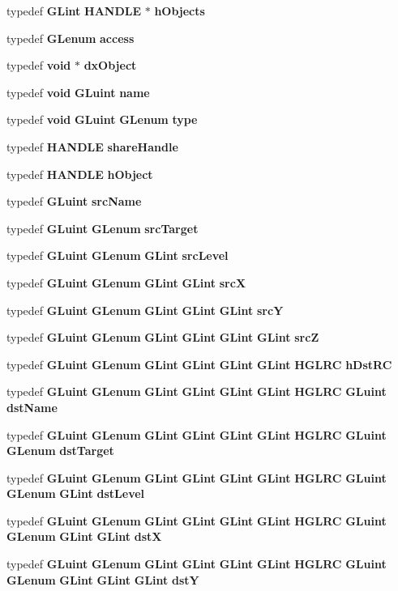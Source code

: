 \begin{DoxyCompactItemize}
\item 
typedef {\bf G\+Lint} {\bf H\+A\+N\+D\+LE} $\ast$ {\bf h\+Objects}
\item 
typedef {\bf G\+Lenum} {\bf access}
\item 
typedef {\bf void} $\ast$ {\bf dx\+Object}
\item 
typedef {\bf void} {\bf G\+Luint} {\bf name}
\item 
typedef {\bf void} {\bf G\+Luint} {\bf G\+Lenum} {\bf type}
\item 
typedef {\bf H\+A\+N\+D\+LE} {\bf share\+Handle}
\item 
typedef {\bf H\+A\+N\+D\+LE} {\bf h\+Object}
\item 
typedef {\bf G\+Luint} {\bf src\+Name}
\item 
typedef {\bf G\+Luint} {\bf G\+Lenum} {\bf src\+Target}
\item 
typedef {\bf G\+Luint} {\bf G\+Lenum} {\bf G\+Lint} {\bf src\+Level}
\item 
typedef {\bf G\+Luint} {\bf G\+Lenum} {\bf G\+Lint} {\bf G\+Lint} {\bf srcX}
\item 
typedef {\bf G\+Luint} {\bf G\+Lenum} {\bf G\+Lint} {\bf G\+Lint} {\bf G\+Lint} {\bf srcY}
\item 
typedef {\bf G\+Luint} {\bf G\+Lenum} {\bf G\+Lint} {\bf G\+Lint} {\bf G\+Lint} {\bf G\+Lint} {\bf srcZ}
\item 
typedef {\bf G\+Luint} {\bf G\+Lenum} {\bf G\+Lint} {\bf G\+Lint} {\bf G\+Lint} {\bf G\+Lint} {\bf H\+G\+L\+RC} {\bf h\+Dst\+RC}
\item 
typedef {\bf G\+Luint} {\bf G\+Lenum} {\bf G\+Lint} {\bf G\+Lint} {\bf G\+Lint} {\bf G\+Lint} {\bf H\+G\+L\+RC} {\bf G\+Luint} {\bf dst\+Name}
\item 
typedef {\bf G\+Luint} {\bf G\+Lenum} {\bf G\+Lint} {\bf G\+Lint} {\bf G\+Lint} {\bf G\+Lint} {\bf H\+G\+L\+RC} {\bf G\+Luint} {\bf G\+Lenum} {\bf dst\+Target}
\item 
typedef {\bf G\+Luint} {\bf G\+Lenum} {\bf G\+Lint} {\bf G\+Lint} {\bf G\+Lint} {\bf G\+Lint} {\bf H\+G\+L\+RC} {\bf G\+Luint} {\bf G\+Lenum} {\bf G\+Lint} {\bf dst\+Level}
\item 
typedef {\bf G\+Luint} {\bf G\+Lenum} {\bf G\+Lint} {\bf G\+Lint} {\bf G\+Lint} {\bf G\+Lint} {\bf H\+G\+L\+RC} {\bf G\+Luint} {\bf G\+Lenum} {\bf G\+Lint} {\bf G\+Lint} {\bf dstX}
\item 
typedef {\bf G\+Luint} {\bf G\+Lenum} {\bf G\+Lint} {\bf G\+Lint} {\bf G\+Lint} {\bf G\+Lint} {\bf H\+G\+L\+RC} {\bf G\+Luint} {\bf G\+Lenum} {\bf G\+Lint} {\bf G\+Lint} {\bf G\+Lint} {\bf dstY}

\end{DoxyCompactItemize}
